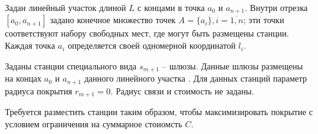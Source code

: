 Задан линейный участок длиной $L$ с концами в точка $a_0$ и $a_{n+1}$. Внутри  отрезка $[a_0, a_{n+1}]$ задано конечное множество точек $A=\{a_i\}, i=\overline{1,n}$; эти точки соответствуют набору свободных мест, где могут быть размещены станции. Каждая точка $a_i$ определяется своей одномерной координатой $l_i$.

Заданы станции специального вида $s_{m+1}$ -- шлюзы. Данные шлюзы размещены на концах $a_0$ и $a_{n+1}$ данного линейного участка . Для данных станций параметр радиуса покрытия $r_{m+1}=0$. Радиус связи и стоимость не заданы.

Требуется разместить станции таким образом, чтобы максимизировать покрытие с условием ограничения на суммарное стоиомсть $C$.

 











